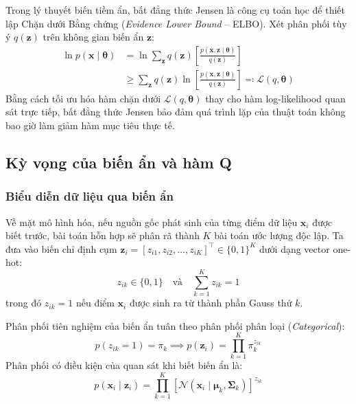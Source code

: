 \documentclass[12pt,a4paper]{article}
\newcommand{\vx}{\mathbf{x}}
\newcommand{\vz}{\mathbf{z}}
\newcommand{\vmu}{\boldsymbol{\mu}}
\newcommand{\vSigma}{\boldsymbol{\Sigma}}
\newcommand{\vtheta}{\boldsymbol{\theta}}
\newcommand{\Normal}{\mathcal{N}}
\begin{document}
Trong lý thuyết biến tiềm ẩn, bất đẳng thức Jensen là công cụ toán học để thiết lập Chặn dưới Bằng chứng (\textit{Evidence Lower Bound} -- ELBO). Xét phân phối tùy ý $q(\vz)$ trên không gian biến ẩn $\vz$:
\begin{align}
    \ln p(\vx \mid \vtheta) &= \ln \sum_{\vz} q(\vz) \left[ \frac{p(\vx, \vz \mid \vtheta)}{q(\vz)} \right] \\
    &\ge \sum_{\vz} q(\vz) \ln \left[ \frac{p(\vx, \vz \mid \vtheta)}{q(\vz)} \right] \eqqcolon \mathcal{L}(q, \vtheta) \label{eq:elbo}
\end{align}
Bằng cách tối ưu hóa hàm chặn dưới $\mathcal{L}(q, \vtheta)$ thay cho hàm log-likelihood quan sát trực tiếp, bất đẳng thức Jensen bảo đảm quá trình lặp của thuật toán không bao giờ làm giảm hàm mục tiêu thực tế.

\subsection{Kỳ vọng của biến ẩn và hàm Q}
\label{subsec:latent_and_q_func}

\subsubsection{Biểu diễn dữ liệu qua biến ẩn}

Về mặt mô hình hóa, nếu nguồn gốc phát sinh của từng điểm dữ liệu $\vx_i$ được biết trước, bài toán hỗn hợp sẽ phân rã thành $K$ bài toán ước lượng độc lập. Ta đưa vào biến chỉ định cụm $\vz_i = [z_{i1}, z_{i2}, \dots, z_{iK}]^\top \in \{0, 1\}^K$ dưới dạng vector one-hot:
\begin{equation}
    z_{ik} \in \{0, 1\} \quad \text{và} \quad \sum_{k=1}^K z_{ik} = 1
\end{equation}
trong đó $z_{ik} = 1$ nếu điểm $\vx_i$ được sinh ra từ thành phần Gauss thứ $k$.

Phân phối tiên nghiệm của biến ẩn tuân theo phân phối phân loại (\textit{Categorical}):
\begin{equation}
    p(z_{ik} = 1) = \pi_k \implies p(\vz_i) = \prod_{k=1}^K \pi_k^{z_{ik}}
\end{equation}
Phân phối có điều kiện của quan sát khi biết biến ẩn là:
\begin{equation}
    p(\vx_i \mid \vz_i) = \prod_{k=1}^K \left[ \Normal(\vx_i \mid \vmu_k, \vSigma_k) \right]^{z_{ik}}
\end{equation}
\end{document}
